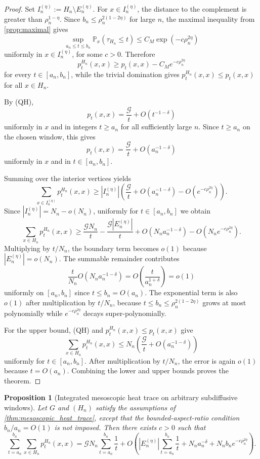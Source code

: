 \documentclass[reqno]{amsart}
\numberwithin{equation}{section}
\newtheorem{proposition}[proposition]{Proposition}
\theoremstyle{definition}
\theoremstyle{remark}
\newcommand{\Cref}[1]{\autoref{#1}}
\newcommand{\cG}{\mathcal{G}}
\newcommand{\Prob}{\mathbb{P}}
\begin{document}
\begin{proof}
Set $I_n^{(\eta)}:=H_n\setminus E_n^{(\eta)}$. For $x\in I_n^{(\eta)}$, the distance to the complement is greater than $\rho_n^{1-\eta}$. Since $b_n\le \rho_n^{2(1-2\eta)}$ for large $n$, the maximal inequality from \Cref{prop:maximal} gives
\[
  \sup_{a_n\le t\le b_n}\Prob_x(\tau_{H_n}\le t)\le C_M \exp(-c\rho_n^{2\eta})
\]
uniformly in $x\in I_n^{(\eta)}$, for some $c>0$. Therefore
\[
  p_t^{H_n}(x,x)
  \ge p_t(x,x)-C_M e^{-c\rho_n^{2\eta}}
\]
for every $t\in[a_n,b_n]$, while the trivial domination gives $p_t^{H_n}(x,x)\le p_t(x,x)$ for all $x\in H_n$.

By \textup{(QH)},
\[
  p_t(x,x)=\frac{\cG}{t}+O(t^{-1-\delta})
\]
uniformly in $x$ and in integers $t\ge a_n$ for all sufficiently large $n$. Since $t\ge a_n$ on the chosen window, this gives
\[
  p_t(x,x)=\frac{\cG}{t}+O(a_n^{-1-\delta})
\]
uniformly in $x$ and in $t\in[a_n,b_n]$.

Summing over the interior vertices yields
\[
  \sum_{x\in I_n^{(\eta)}} p_t^{H_n}(x,x)
  \ge
  |I_n^{(\eta)}|
  \left(
    \frac{\cG}{t}
    + O(a_n^{-1-\delta})
    - O(e^{-c\rho_n^{2\eta}})
  \right).
\]
Since $|I_n^{(\eta)}|=N_n-o(N_n)$, uniformly for $t\in[a_n,b_n]$ we obtain
\[
  \sum_{x\in H_n} p_t^{H_n}(x,x)
  \ge
  \frac{\cG N_n}{t}
  - \frac{\cG |E_n^{(\eta)}|}{t}
  + O(N_n a_n^{-1-\delta})
  - O(N_n e^{-c\rho_n^{2\eta}}).
\]
Multiplying by $t/N_n$, the boundary term becomes $o(1)$ because $|E_n^{(\eta)}|=o(N_n)$. The summable remainder contributes
\[
  \frac{t}{N_n} O(N_n a_n^{-1-\delta}) = O\!\left(\frac{t}{a_n^{1+\delta}}\right)=o(1)
\]
uniformly on $[a_n,b_n]$ since $t\le b_n=O(a_n)$. The exponential term is also $o(1)$ after multiplication by $t/N_n$, because $t\le b_n\le \rho_n^{2(1-2\eta)}$ grows at most polynomially while $e^{-c\rho_n^{2\eta}}$ decays super-polynomially.

For the upper bound, \textup{(QH)} and $p_t^{H_n}(x,x)\le p_t(x,x)$ give
\[
  \sum_{x\in H_n} p_t^{H_n}(x,x)
  \le
  N_n\left(\frac{\cG}{t}+O(a_n^{-1-\delta})\right)
\]
uniformly for $t\in[a_n,b_n]$. After multiplication by $t/N_n$, the error is again $o(1)$ because $t=O(a_n)$. Combining the lower and upper bounds proves the theorem.
\end{proof}

\begin{proposition}[Integrated mesoscopic heat trace on arbitrary subdiffusive windows]\label{prop:integrated_mesoscopic_heat_trace}
Let $G$ and $(H_n)$ satisfy the assumptions of \Cref{thm:mesoscopic_heat_trace}, except that the bounded-aspect-ratio condition $b_n/a_n=O(1)$ is not imposed. Then there exists $c>0$ such that
\[
  \sum_{t=a_n}^{b_n}\sum_{x\in H_n} p_t^{H_n}(x,x)
  =
  \cG N_n\sum_{t=a_n}^{b_n}\frac1t
  +
  O\!\left(
    |E_n^{(\eta)}|\sum_{t=a_n}^{b_n}\frac1t
    + N_n a_n^{-\delta}
    + N_n b_n e^{-c\rho_n^{2\eta}}
  \right).
\]
\end{proposition}
\end{document}
